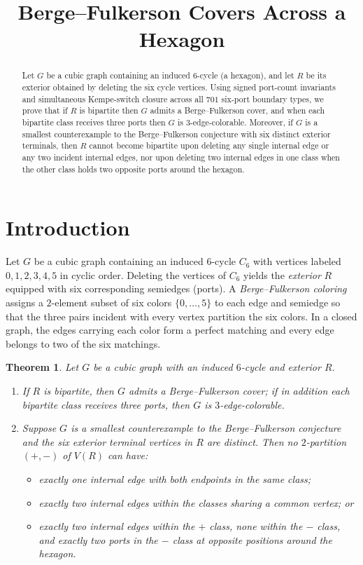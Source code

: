 \documentclass[11pt]{article}
\title{Berge--Fulkerson Covers Across a Hexagon}
\author{}
\date{}
\newtheorem{theorem}{Theorem}
\begin{document}
\maketitle

\begin{abstract}
Let $G$ be a cubic graph containing an induced $6$-cycle (a hexagon), and let $R$ be its
exterior obtained by deleting the six cycle vertices. Using signed port-count invariants
and simultaneous Kempe-switch closure across all $701$ six-port boundary types, we prove
that if $R$ is bipartite then $G$ admits a Berge--Fulkerson cover, and when each
bipartite class receives three ports then $G$ is $3$-edge-colorable. Moreover, if $G$ is
a smallest counterexample to the Berge--Fulkerson conjecture with six distinct exterior
terminals, then $R$ cannot become bipartite upon deleting any single internal edge or any
two incident internal edges, nor upon deleting two internal edges in one class when the
other class holds two opposite ports around the hexagon.
\end{abstract}

\section{Introduction}

Let $G$ be a cubic graph containing an induced $6$-cycle $C_6$ with vertices labeled
$0,1,2,3,4,5$ in cyclic order. Deleting the vertices of $C_6$ yields the \emph{exterior}
$R$ equipped with six corresponding semiedges (ports). A \emph{Berge--Fulkerson coloring}
assigns a $2$-element subset of six colors $\{0,\dots,5\}$ to each edge and semiedge so
that the three pairs incident with every vertex partition the six colors. In a closed
graph, the edges carrying each color form a perfect matching and every edge belongs to
two of the six matchings.

\begin{theorem}\label{thm:hexagon}
Let $G$ be a cubic graph with an induced $6$-cycle and exterior $R$.
\begin{enumerate}
  \item If $R$ is bipartite, then $G$ admits a Berge--Fulkerson cover; if in addition
        each bipartite class receives three ports, then $G$ is $3$-edge-colorable.
  \item Suppose $G$ is a smallest counterexample to the Berge--Fulkerson conjecture and
        the six exterior terminal vertices in $R$ are distinct. Then no $2$-partition
        $(+,-)$ of $V(R)$ can have:
        \begin{itemize}
          \item exactly one internal edge with both endpoints in the same class;
          \item exactly two internal edges within the classes sharing a common vertex; or
          \item exactly two internal edges within the $+$ class, none within the $-$
                class, and exactly two ports in the $-$ class at opposite positions
                around the hexagon.
        \end{itemize}
\end{enumerate}
\end{theorem}
\end{document}
